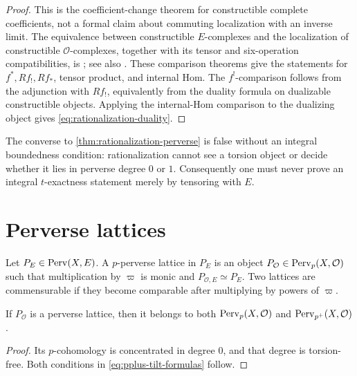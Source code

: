 \begin{proof}
This is the coefficient-change theorem for constructible complete
coefficients, not a formal claim about commuting localization with an
inverse limit.  The equivalence between constructible \(E\)-complexes and
the localization of constructible \(\mathcal O\)-complexes, together with
its tensor and six-operation compatibilities, is
\cite[Proposition~6.8.14 and Remark~6.8.15]{BhattScholzeProEtale}; see also
\cite[Theorem~7.7]{HRSConstructible}.  These comparison theorems give the
statements for \(f^*,Rf_!,Rf_*\), tensor product, and internal Hom.
The \(f^!\)-comparison follows from the adjunction with \(Rf_!\), equivalently
from the duality formula on dualizable constructible objects.  Applying the
internal-Hom comparison to the dualizing object gives
\eqref{eq:rationalization-duality}.
\end{proof}

\begin{warning}
The converse to \cref{thm:rationalization-perverse} is false without an
integral boundedness condition: rationalization cannot see a torsion object
or decide whether it lies in perverse degree \(0\) or \(1\).  Consequently
one must never prove an integral \(t\)-exactness statement merely by
tensoring with \(E\).
\end{warning}

\section{Perverse lattices}

\begin{definition}
\label{def:perverse-lattice}
Let \(P_E\in\operatorname{Perv}(X,E)\).  A \(p\)-perverse lattice in \(P_E\) is an object
\(P_{\mathcal O}\in\operatorname{Perv}_p(X,\mathcal O)\) such that multiplication by
\(\varpi\) is monic and \(P_{\mathcal O,E}\simeq P_E\).  Two lattices are
commensurable if they become comparable after multiplying by powers of
\(\varpi\).
\end{definition}

\begin{lemma}
\label{lem:lattice-in-both-hearts}
If \(P_{\mathcal O}\) is a perverse lattice, then it belongs to both
\(\operatorname{Perv}_p(X,\mathcal O)\) and \(\operatorname{Perv}_{p^+}(X,\mathcal O)\).
\end{lemma}

\begin{proof}
Its \(p\)-cohomology is concentrated in degree \(0\), and that degree is
torsion-free.  Both conditions in \eqref{eq:pplus-tilt-formulas} follow.
\end{proof}

